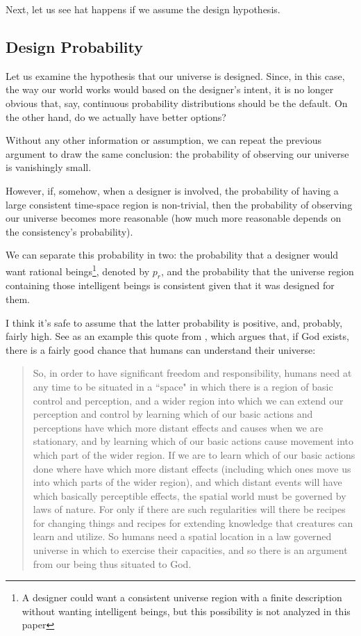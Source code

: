 \documentclass[a4paper
,draft
]{article}
\newcommand{\ghilimele}[1]{``#1"}
\begin{document}
Next, let us see hat happens if we assume the design hypothesis.

\subsection{Design Probability}
\label{sec:design-probability}

Let us examine the hypothesis that our universe is designed.
Since, in this case, the way our world works would based
on the designer's intent,
it is no longer obvious that, say, continuous probability distributions
should be the default.
On the other hand, do we actually have better options?

Without any other information or assumption,
we can repeat the previous argument to draw the same conclusion:
the probability of observing our universe is vanishingly small.

However, if, somehow, when a designer is involved, the probability of having
a large consistent time-space region is non-trivial, then
the probability of observing our universe becomes more reasonable (how much
more reasonable depends on the consistency's probability).

We can separate this probability in two: the probability that a designer
would want rational beings\footnote{A designer could want a consistent universe
region with a finite
description without wanting intelligent beings, but this possibility is not
analyzed in this paper}, denoted by $p_r$, and
the probability that the universe region containing
those intelligent beings is consistent
given that it was designed for them.

I think it's safe to assume that the latter probability is positive,
and, probably, fairly high. See as an example this quote from
\textcite{Swinburne2003}, which argues that, if God exists,
there is a fairly good chance that humans can understand their universe:

\begin{quote}
  So, in order to have significant freedom and responsibility, humans need
  at any time to be situated in a \ghilimele{space} in which there is a
  region of basic control and perception, and a wider region into which
  we can extend our perception and control by learning which of our
  basic actions and perceptions have which more distant effects and causes
  when we are stationary, and by learning which of our basic actions cause
  movement into which part of the wider region.
  If we are to learn which of our basic actions done where have which
  more distant effects (including which ones move us into which parts
  of the wider region), and which distant events will have which basically
  perceptible effects, the spatial world must be governed by laws of nature.
  For only if there are such regularities will there be recipes for changing
  things and recipes for extending knowledge that creatures can learn and
  utilize.
  So humans need a spatial location in a law governed universe in which to
  exercise their capacities, and so there is an argument from our being thus
  situated to God.
\end{quote}
\end{document}
